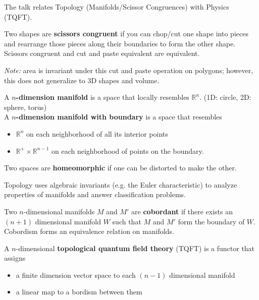 \documentclass[12pt]{amsart}
\begin{document}
The talk relates Topology (Manifolds/Scissor Congruences) with Physics (TQFT). \\

\begin{definition}
Two shapes are \textbf{scissors congruent} if you can chop/cut one shape into pieces and rearrange those pieces along their boundaries to form the other shape. \\

Scissors congruent and cut and paste equivalent are equivalent.
\end{definition}

\textit{Note:} area is invariant under this cut and paste operation on polygons; however, this does not generalize to 3D shapes and volume.

\begin{definition}[Manifold]
A \textbf{$n$-dimension manifold} is a space that locally resembles $\mathbb{R}^n$. (1D: circle, 2D: sphere, torus) \\

A \textbf{$n$-dimension manifold with boundary} is a space that resembles
\begin{itemize}
    \item $\mathbb{R}^n$ on each neighborhood of all its interior points
    \item $\mathbb{R}^+ \times \mathbb{R}^{n-1}$ on each neighborhood of points on the boundary.
\end{itemize}
\end{definition}

\begin{definition}[Homeomorphism]
Two spaces are \textbf{homeomorphic} if one can be distorted to make the other.
\end{definition}

Topology uses algebraic invariants (e.g. the Euler characteristic) to analyze properties of manifolds and answer classification problems.

\begin{definition}[Cobordism]
Two $n$-dimensional manifolds $M$ and $M'$ are \textbf{cobordant} if there exists an $(n+1)$ dimensional manifold $W$ such that $M$ and $M'$ form the boundary of $W$. \\

Cobordism forms an equivalence relation on manifolds.
\end{definition}

\begin{definition}[TQFT]
A $n$-dimensional \textbf{topological quantum field theory} (TQFT) is a functor that assigns
\begin{itemize}
    \item a finite dimension vector space to each $(n-1)$ dimensional manifold
    \item a linear map to a bordism between them
\end{itemize}
\end{definition}
\end{document}
